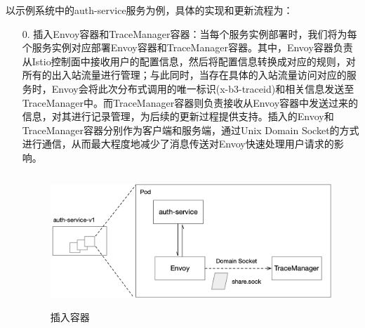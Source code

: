 \documentclass[12pt,a4paper]{article}
\begin{document}
以示例系统中的auth-service服务为例，具体的实现和更新流程为：
\begin{enumerate}
	\item [0.] 插入Envoy容器和TraceManager容器：当每个服务实例部署时，我们将为每个服务实例对应部署Envoy容器和TraceManager容器。其中，Envoy容器负责从Istio控制面中接收用户的配置信息，然后将配置信息转换成对应的规则，对所有的出入站流量进行管理；与此同时，当存在具体的入站流量访问对应的服务时，Envoy会将此次分布式调用的唯一标识(x-b3-traceid)和相关信息发送至TraceManager中。而TraceManager容器则负责接收从Envoy容器中发送过来的信息，对其进行记录管理，为后续的更新过程提供支持。插入的Envoy和TraceManager容器分别作为客户端和服务端，通过Unix Domain Socket的方式进行通信，从而最大程度地减少了消息传送对Envoy快速处理用户请求的影响。
	\begin{figure}[ht]
	 \centering
	 \includegraphics[height=5cm]{images/insert_containers.png}
	 \caption{插入容器}
	 \label{fig:insert_containers}
	\end{figure}


\end{enumerate}
\end{document}
